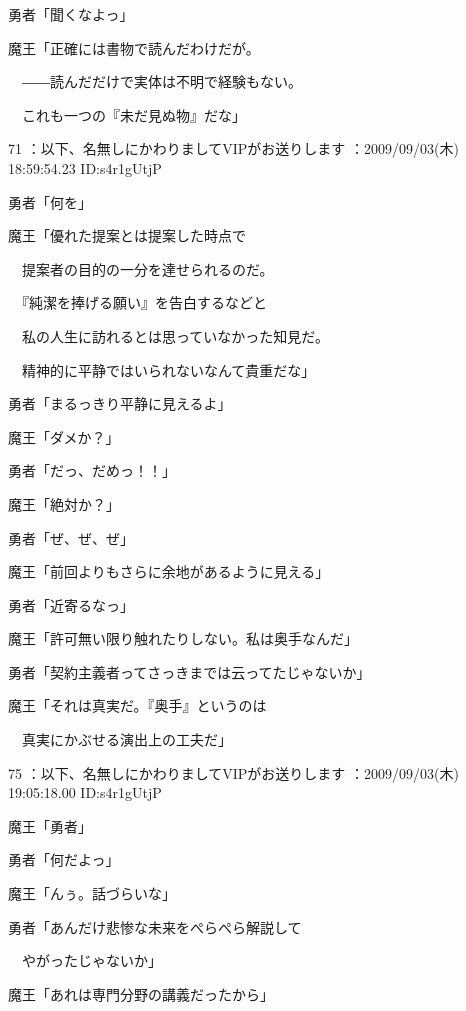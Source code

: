 \documentclass[a4j,twocolumn]{tarticle}
\begin{document}
勇者「聞くなよっ」 



魔王「正確には書物で読んだわけだが。\par{} 
　――読んだだけで実体は不明で経験もない。\par{} 
　これも一つの『未だ見ぬ物』だな」 

	

	

71 ：以下、名無しにかわりましてVIPがお送りします ：2009/09/03(木) 18:59:54.23 ID:s4r1gUtjP


勇者「何を」\par{} 
魔王「優れた提案とは提案した時点で \par{}
　提案者の目的の一分を達せられるのだ。\par{} 
　『純潔を捧げる願い』を告白するなどと\par{} 
　私の人生に訪れるとは思っていなかった知見だ。\par{} 
　精神的に平静ではいられないなんて貴重だな」 



勇者「まるっきり平静に見えるよ」 



魔王「ダメか？」\par{} 
勇者「だっ、だめっ！！」 



魔王「絶対か？」\par{} 
勇者「ぜ、ぜ、ぜ」 



魔王「前回よりもさらに余地があるように見える」\par{} 
勇者「近寄るなっ」 



魔王「許可無い限り触れたりしない。私は奥手なんだ」\par{} 
勇者「契約主義者ってさっきまでは云ってたじゃないか」 



魔王「それは真実だ。『奥手』というのは\par{} 
　真実にかぶせる演出上の工夫だ」 

	
    
    

75 ：以下、名無しにかわりましてVIPがお送りします ：2009/09/03(木) 19:05:18.00 ID:s4r1gUtjP 


魔王「勇者」\par{} 
勇者「何だよっ」 



魔王「んぅ。話づらいな」\par{} 
勇者「あんだけ悲惨な未来をぺらぺら解説して \par{}
　やがったじゃないか」\par{} 
魔王「あれは専門分野の講義だったから」 
\end{document}
